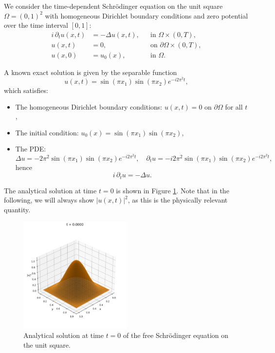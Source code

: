 \documentclass{article}
\theoremstyle{definition}
\theoremstyle{plain}
\theoremstyle{remark}
\begin{document}
We consider the time-dependent Schrödinger equation on the unit square $\Omega = (0,1)^2$ with homogeneous Dirichlet boundary conditions and zero potential over the time interval $[0,1]$:
\begin{align*}
i \, \partial_t u(x,t) &= -\Delta u(x,t), &&\text{in } \Omega \times (0,T), \\
u(x,t) &= 0, &&\text{on } \partial \Omega \times (0,T), \\
u(x,0) &= u_0(x), &&\text{in } \Omega.
\end{align*}

A known exact solution is given by the separable function
\[
u(x,t) = \sin(\pi x_1)\sin(\pi x_2) e^{-i 2\pi^2 t},
\]
which satisfies:
\begin{itemize}
  \item The homogeneous Dirichlet boundary conditions: $u(x,t) = 0$ on $\partial \Omega$ for all $t$,
  \item The initial condition: $u_0(x) = \sin(\pi x_1)\sin(\pi x_2)$,
  \item The PDE:
  \[
  \Delta u = -2\pi^2 \sin(\pi x_1)\sin(\pi x_2) e^{-i 2\pi^2 t}, \quad
  \partial_t u = -i 2\pi^2 \sin(\pi x_1)\sin(\pi x_2) e^{-i 2\pi^2 t},
  \]
  hence
  \[
  i \, \partial_t u = -\Delta u.
  \]
\end{itemize}

The analytical solution at time $t = 0$ is shown in Figure \ref{fig:initial_state}. Note that in the following, we will always show $|u(x,t)|^2$, as this is the physically relevant quantity.

\begin{figure}[h!]
  \centering
  \includegraphics[width=0.5\textwidth, trim=0cm 0cm 0cm 1cm, clip]{figures/initial_state_3d.png}
  \caption{Analytical solution at time $t = 0$ of the free Schrödinger equation on the unit square.}
  \label{fig:initial_state}
\end{figure}
\end{document}
